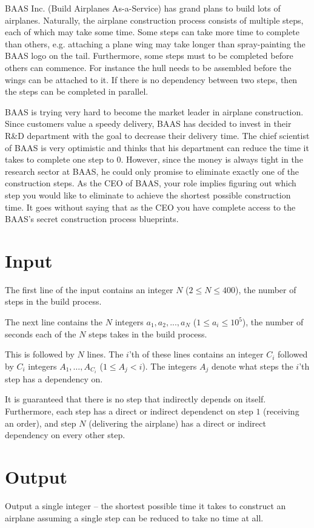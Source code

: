 BAAS Inc. (Build Airplanes As-a-Service) has grand plans to build lots of airplanes.
Naturally, the airplane construction process consists of multiple steps, each of which may take some time.
Some steps can take more time to complete than others, e.g. attaching a plane wing may take longer than spray-painting the BAAS logo on the tail.
Furthermore, some steps must to be completed before others can commence.
For instance the hull needs to be assembled before the wings can be attached to it.
If there is no dependency between two steps, then the steps can be completed in parallel.

BAAS is trying very hard to become the market leader in airplane construction.
Since customers value a speedy delivery, BAAS has decided to invest in their R\&D department with the goal to decrease their delivery time.
The chief scientist of BAAS is very optimistic and thinks that his department can reduce the time it takes to complete one step to 0.
However, since the money is always tight in the research sector at BAAS, he could only promise to eliminate exactly one of the construction steps.
As the CEO of BAAS, your role implies figuring out which step you would like to eliminate to achieve the shortest possible construction time.
It goes without saying that as the CEO you have complete access to the BAAS's secret construction process blueprints.

\section*{Input}
The first line of the input contains an integer $N$ ($2 \le N \le 400$), the number of steps in the build process.

The next line contains the $N$ integers $a_1, a_2, ..., a_N$ ($1 \le a_i \le 10^5$), the number of seconds each of the $N$ steps takes in the build process.

This is followed by $N$ lines.
The $i$'th of these lines contains an integer $C_i$ followed by $C_i$ integers $A_1, \dots, A_{C_i}$ ($1 \le A_j < i$).
The integers $A_j$ denote what steps the $i$'th step has a dependency on.

It is guaranteed that there is no step that indirectly depends on itself.
Furthermore, each step has a direct or indirect dependenct on step $1$ (receiving an order), and step $N$ (delivering the airplane) has a direct or indirect dependency on every other step.

\section*{Output}
Output a single integer -- the shortest possible time it takes to construct an airplane assuming a single step can be reduced to take no time at all.
